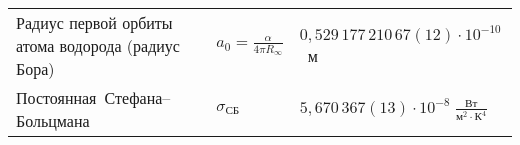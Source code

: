 \begin{booksupplement}
\begin{longtable}{p{46mm}>{\centering}p{14mm}p{45mm}}
\bigstrut[t] Радиус первой орбиты\newline
атома водорода (радиус Бора)
                 & $a_0 = \frac{\alpha}{4\pi R_{\infty}}$
                 & $0,529\,177\,210\,67(12)\cdot 10^{-10}$~м            \\
\mbox{Постоянная Стефана--Больцмана}
                 & $\sigma_{СБ}$
                 & $5,670\,367(13)\cdot 10^{-8}\;\frac{Вт}{м^2\cdot К^4}$ \\
\bottomrule[1pt]
\end{longtable}


\end{booksupplement}
